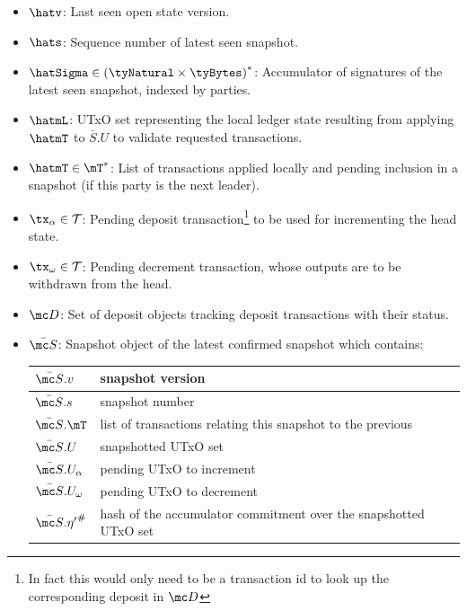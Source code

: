 \begin{itemize}
	\item $\hatv$: Last seen open state version.
	\item $\hats$: Sequence number of latest seen snapshot.
	\item $\hatSigma \in {(\tyNatural \times \tyBytes)}^{*}$: Accumulator of
	      signatures of the latest seen snapshot, indexed by parties.
	\item $\hatmL$: UTxO set representing the local ledger state resulting from
	      applying $\hatmT$ to $\bar{S}.U$ to validate requested transactions.
	\item $\hatmT \in \mT^{*}$: List of transactions applied locally and pending
	      inclusion in a snapshot (if this party is the next leader).
	\item $\tx_\alpha \in \mathcal{T}$: Pending deposit transaction\footnote{In
		      fact this would only need to be a transaction id to look up the
		      corresponding deposit in $\mc D$} to be used for incrementing the head
	      state.
	\item $\tx_\omega \in \mathcal{T}$: Pending decrement transaction, whose outputs are to be
	      withdrawn from the head.
	\item $\mc D$: Set of deposit objects tracking deposit transactions with their
	      status.
	\item $\bar{\mc S}$: Snapshot object of the latest confirmed snapshot which
	      contains:
	      \begin{center}
		      \begin{tabular}{|l|l|}\hline
			      $\bar{\mc S}.v$        & snapshot version                                            \\ \hline
			      $\bar{\mc S}.s$        & snapshot number                                             \\ \hline
			      $\bar{\mc S}.\mT$      & list of transactions relating this snapshot to the previous \\ \hline
			      $\bar{\mc S}.U$        & snapshotted UTxO set                                        \\ \hline
			      $\bar{\mc S}.U_\alpha$ & pending UTxO to increment                                   \\ \hline
			      $\bar{\mc S}.U_\omega$           & pending UTxO to decrement                                        \\ \hline
			      $\bar{\mc S}.{\eta'}^{\#}$       & hash of the accumulator commitment over the snapshotted UTxO set \\ \hline
		      \end{tabular}
	      \end{center}
\end{itemize}

